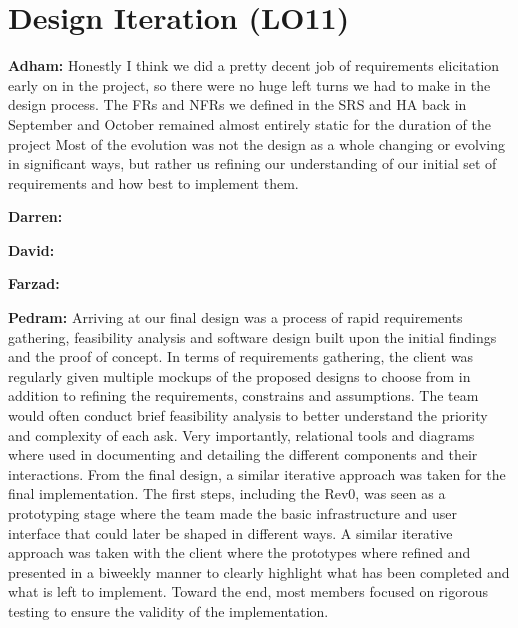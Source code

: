 \documentclass{article}
\begin{document}
\section{Design Iteration (LO11)}


\textbf{Adham:} Honestly I think we did a pretty decent job of requirements elicitation early on in the project, so there were no huge left turns we had to make in the design
process. The FRs and NFRs we defined in the SRS and HA back in September and October remained almost entirely static for the duration of the project
Most of the evolution was not the design as a whole changing or evolving in significant ways, but rather us refining our understanding of our initial set of requirements
and how best to implement them.

\textbf{Darren:}

\textbf{David:}

\textbf{Farzad:}

\textbf{Pedram:} Arriving at our final design was a process of rapid requirements gathering, feasibility analysis and software design built upon the initial findings and the 
proof of concept. In terms of requirements gathering, the client was regularly given multiple mockups of the proposed designs to choose from in addition to refining the 
requirements, constrains and assumptions. The team would often conduct brief feasibility analysis to better understand the priority and complexity of each ask. 
Very importantly, relational tools and diagrams where used in documenting and detailing the different components and their interactions.  
From the final design, a similar iterative approach was taken for the final implementation. 
The first steps, including the Rev0, was seen as a prototyping stage where the team made the basic infrastructure and user interface that could later be shaped in different 
ways. A similar iterative approach was taken with the client where the prototypes where refined and presented in a biweekly manner to clearly highlight what has been completed 
and what is left to implement. Toward the end, most members focused on rigorous testing to ensure the validity of the implementation.\\
\end{document}
